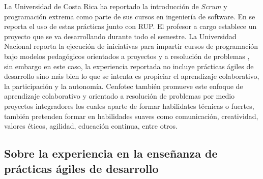 La Universidad de Costa Rica ha reportado la introducción de \emph{Scrum} y programación extrema como parte de sus cursos en ingeniería de software. En \cite{salazar} se reporta el uso de estas prácticas junto con RUP. El profesor a cargo establece un proyecto que se va desarrollando durante todo el semestre. La Universidad Nacional reporta la ejecución de iniciativas para impartir cursos de programación bajo modelos pedagógicos orientados a proyectos y a resolución de problemas \cite{mora-et-al-1, mora-et-al-2}, sin embargo en este caso, la experiencia reportada no incluye prácticas ágiles de desarrollo sino más bien lo que se intenta es propiciar el aprendizaje colaborativo, la participación y la autonomía. Cenfotec también promueve este enfoque de aprendizaje colaborativo y orientado a resolución de problemas\cite{trejos-1, cenfotec-2} por medio proyectos integradores los cuales aparte de formar habilidates técnicas o fuertes, también pretenden formar en habilidades suaves como comunicación, creatividad, valores éticos, agilidad, educación continua, entre otros.

\subsection{Sobre la experiencia en la enseñanza de prácticas ágiles de desarrollo}

